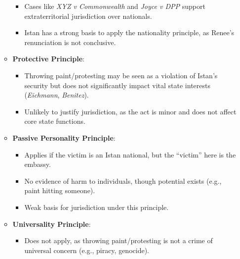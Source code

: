 \begin{itemize}
\begin{itemize}
\begin{itemize}
            \item Cases like \textit{XYZ v Commonwealth} and \textit{Joyce v DPP} support extraterritorial jurisdiction over nationals.
            \item Istan has a strong basis to apply the nationality principle, as Renee’s renunciation is not conclusive.
        \end{itemize}
        \item \textbf{Protective Principle}:
        \begin{itemize}
            \item Throwing paint/protesting may be seen as a violation of Istan’s security but does not significantly impact vital state interests (\textit{Eichmann}, \textit{Benitez}).
            \item Unlikely to justify jurisdiction, as the act is minor and does not affect core state functions.
        \end{itemize}
        \item \textbf{Passive Personality Principle}:
        \begin{itemize}
            \item Applies if the victim is an Istan national, but the “victim” here is the embassy.
            \item No evidence of harm to individuals, though potential exists (e.g., paint hitting someone).
            \item Weak basis for jurisdiction under this principle.
        \end{itemize}
        \item \textbf{Universality Principle}:
        \begin{itemize}
            \item Does not apply, as throwing paint/protesting is not a crime of universal concern (e.g., piracy, genocide).
        \end{itemize}
    \end{itemize}
\end{itemize}

